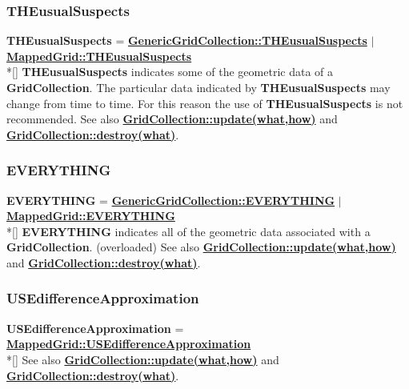 \documentclass{article}
\begin{document}
  \subsubsection{THEusualSuspects}
  \label{GridCollection::THEusualSuspects}
    \textbf{THEusualSuspects}
    =      {\bf{}\hyperref{GenericGridCollection::THEusualSuspects}{GenericGridCollection::THEusualSuspects \rm(\S}{)}{GenericGridCollection::THEusualSuspects}}
    $\mid$ {\bf{}\hyperref{MappedGrid::THEusualSuspects}{MappedGrid::THEusualSuspects \rm(\S}{)}{MappedGrid::THEusualSuspects}} \\*[\parskip]
    \textbf{THEusualSuspects} indicates some of the geometric data of a \textbf{GridCollection}.
    The particular data indicated by \textbf{THEusualSuspects} may change from time to time.
    For this reason the use of \textbf{THEusualSuspects} is not recommended.
    See also {\bf{}\hyperref{update(what,how)}{update(what,how) \rm(\S}{)}{GridCollection::update(what,how)}}
    and {\bf{}\hyperref{destroy(what)}{destroy(what) \rm(\S}{)}{GridCollection::destroy(what)}}.

  \subsubsection{EVERYTHING}
  \label{GridCollection::EVERYTHING}
    \textbf{EVERYTHING}
    =      {\bf{}\hyperref{GenericGridCollection::EVERYTHING}{GenericGridCollection::EVERYTHING \rm(\S}{)}{GenericGridCollection::EVERYTHING}}
    $\mid$ {\bf{}\hyperref{MappedGrid::EVERYTHING}{MappedGrid::EVERYTHING \rm(\S}{)}{MappedGrid::EVERYTHING}} \\*[\parskip]
    \textbf{EVERYTHING} indicates all of the geometric data associated with a \textbf{GridCollection}.  (overloaded)
    See also {\bf{}\hyperref{update(what,how)}{update(what,how) \rm(\S}{)}{GridCollection::update(what,how)}}
    and {\bf{}\hyperref{destroy(what)}{destroy(what) \rm(\S}{)}{GridCollection::destroy(what)}}.

  \subsubsection{USEdifferenceApproximation}
  \label{GridCollection::USEdifferenceApproximation}
    \textbf{USEdifferenceApproximation} =
    {\bf{}\hyperref{MappedGrid::USEdifferenceApproximation}{MappedGrid::USEdifferenceApproximation \rm(\S}{)}{MappedGrid::USEdifferenceApproximation}} \\*[\parskip]
    See also {\bf{}\hyperref{update(what,how)}{update(what,how) \rm(\S}{)}{GridCollection::update(what,how)}}
    and {\bf{}\hyperref{destroy(what)}{destroy(what) \rm(\S}{)}{GridCollection::destroy(what)}}.
\end{document}
